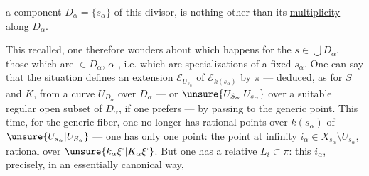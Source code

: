 a component $D_\alpha=\overline{\{s_\alpha\}}$ of this divisor, is nothing other than its \uline{multiplicity} along $D_\alpha$.

This recalled, one therefore wonders about  which happens for the $s\in\bigcup D_\alpha$,     those which are $\in D_\alpha$, $\alpha$ , i.e. which are specializations of a fixed $s_\alpha$. One can say that the situation defines an extension $\mathcal E_{U_{s_\alpha}}$ of $\mathcal E_{k(s_\alpha)}$ by $\pi$ --- deduced, as  for $S$ and $K$, from a  curve $U_{D_\alpha}$ over $D_\alpha$ --- or $\unsure{U_{S_\alpha}|U_{s_\alpha}}$ over a suitable regular open subset of $D_\alpha$, if one prefers --- by passing to the generic point. This time, for the generic fiber, one no longer has  rational points over $k(s_\alpha)$ of $\unsure{U_{s_\alpha}|U_{S_\alpha}}$ --- one has only one point: the point at infinity $i_\alpha\in X_{s_\alpha}\setminus U_{s_\alpha}$, rational over $\unsure{k_\alpha\xi^{\cdot}|K_\alpha\xi^{\cdot}}$. But one  has a relative $L_i\subset\pi$: this $i_\alpha$, precisely, in an essentially canonical way,

